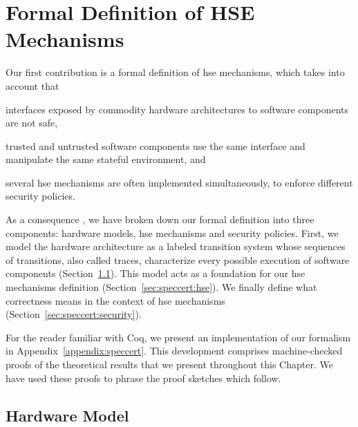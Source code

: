 \chapter{Formal Definition of HSE Mechanisms}
\label{chapter:speccert}


\vspace{1cm}\noindent
%
Our first contribution is a formal definition of \ac{hse} mechanisms, which
takes into account that
%
\begin{inparaenum}[(1)]
\item interfaces exposed by commodity hardware architectures to software
  components are not safe,
\item trusted and untrusted software components use the same interface and
  manipulate the same stateful environment, and
\item several \ac{hse} mechanisms are often implemented simultaneously, to
  enforce different security policies.
\end{inparaenum}
%
As a consequence , we have broken down our formal definition into
three components: hardware models, \ac{hse} mechanisms and security
policies. 
%
First, we model the hardware architecture as a labeled transition system whose
sequences of transitions, also called traces, characterize every possible
execution of software components (Section~\ref{sec:speccert:hardware}).
%
This model acts as a foundation for our \ac{hse} mechanisms definition
(Section~\ref{sec:speccert:hse}).
%
We finally define what correctness means in the context of \ac{hse} mechanisms
(Section~\ref{sec:speccert:security}).

For the reader familiar with Coq, we present an implementation of our formalism
in Appendix~\ref{appendix:speccert}.
%
This development comprises machine-checked proofs of the theoretical results
that we present throughout this Chapter. We have used these proofs to phrase the
proof sketches which follow. 

\section{Hardware Model}
\label{sec:speccert:hardware}

